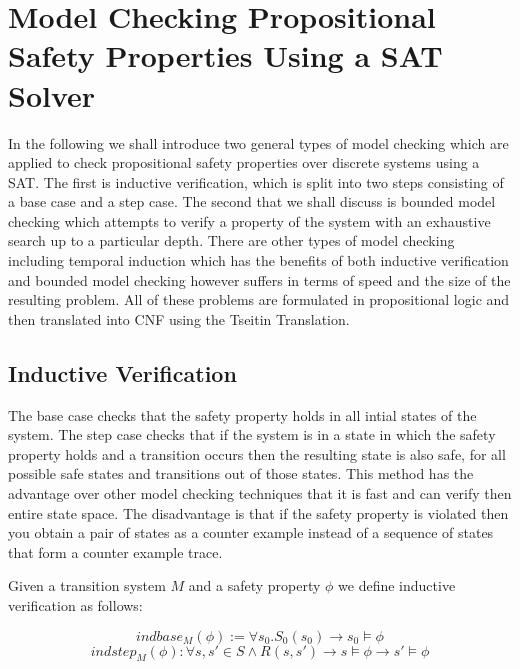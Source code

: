 \section{Model Checking Propositional Safety Properties Using a SAT Solver}


In the following we shall introduce two general types of model checking  which are applied to check propositional safety properties over discrete systems using a SAT. The first is inductive verification, which is split into two steps consisting of a base case and a step case.   The second that we shall discuss is bounded model checking which attempts to verify a property of the system with an exhaustive search up to a particular depth. There are other types of model checking including temporal induction which has the benefits of both inductive verification and bounded model checking however suffers in terms of speed and the size of the resulting problem. All of these problems are formulated in propositional logic and then translated into CNF using the Tseitin Translation.



\subsection*{Inductive Verification}


The base case checks that the safety property holds in all intial states of the system. The step case checks that if the system is in a state in which the safety property holds and a transition occurs then the resulting state is also safe, for all possible safe states and transitions out of those states. This method has the advantage over other model checking techniques that it is fast and can verify then entire state space. The disadvantage is that if the safety property is violated then you obtain a pair of states as a counter example instead of a sequence of states that form a counter example trace.
\medskip
\begin{mydef}
Given a transition system $M$ and a safety property $\phi$ we define inductive verification as follows:

$$indbase_M(\phi)  := \forall s_0. S_0(s_0)  \to s_0 \models \phi $$
$$indstep_M(\phi) : \forall s,s' \in S \wedge R(s, s') \to s \models \phi  \to s' \models \phi$$

\end{mydef}
\medskip
